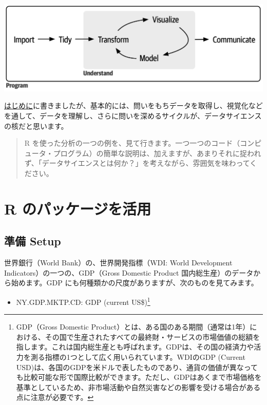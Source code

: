 \documentclass[
  xelatex, ja=standard]{bxjsbook}
\providecommand{\tightlist}{%
  \setlength{\itemsep}{0pt}\setlength{\parskip}{0pt}}
\theoremstyle{definition}
\theoremstyle{definition}
\theoremstyle{definition}
\theoremstyle{definition}
\theoremstyle{remark}
\begin{document}
\includegraphics[width=1\linewidth]{./data/base}

\href{https://icu-hsuzuki.github.io/ds4aj/introduction.html\#introduction}{はじめに}に書きましたが、基本的には、問いをもちデータを取得し、視覚化などを通して、データを理解し、さらに問いを深めるサイクルが、データサイエンスの核だと思います。

\begin{quote}
R を使った分析の一つの例を、見て行きます。一つ一つのコード（コンピュータ・プログラム）の簡単な説明は、加えますが、あまりそれに捉われず、「データサイエンスとは何か？」を考えながら、雰囲気を味わってください。
\end{quote}

\hypertarget{r-ux306eux30d1ux30c3ux30b1ux30fcux30b8ux3092ux6d3bux7528}{%
\section{R のパッケージを活用}\label{r-ux306eux30d1ux30c3ux30b1ux30fcux30b8ux3092ux6d3bux7528}}

\hypertarget{ux6e96ux5099-setup}{%
\subsection{準備 Setup}\label{ux6e96ux5099-setup}}

世界銀行（World Bank）の、世界開発指標（WDI: World Development Indicators）の一つの、GDP（Gross Domestic Product 国内総生産）のデータから始めます。GDP にも何種類かの尺度がありますが、次のものを見てみます。

\begin{itemize}
\tightlist
\item
  NY.GDP.MKTP.CD: GDP (current US\$)\footnote{GDP（Gross Domestic Product）とは、ある国のある期間（通常は1年）における、その国で生産されたすべての最終財・サービスの市場価値の総額を指します。これは国内総生産とも呼ばれます。GDPは、その国の経済力や活力を測る指標の1つとして広く用いられています。WDIのGDP (Current USD)は、各国のGDPを米ドルで表したものであり、通貨の価値が異なっても比較可能な形で国際比較ができます。ただし、GDPはあくまで市場価格を基準としているため、非市場活動や自然災害などの影響を受ける場合がある点に注意が必要です。}
\end{itemize}
\end{document}
